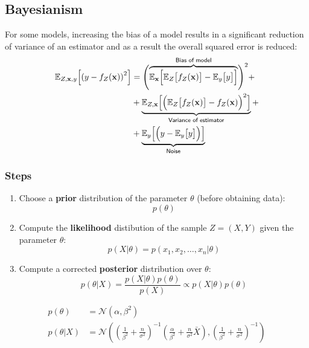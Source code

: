 \subsection{Bayesianism}
For some models, increasing the bias of a model results in a significant reduction of variance of an estimator and as a result the overall squared error is reduced:
\noindent\begin{align*}
    \mathbb{E}_{Z,\mathbf{x},y}\Bigl[{(y-f_Z(\mathbf{x}))}^2\Bigr] & = \Biggl(\overbrace{\mathbb{E}_{\mathbf{x}}\Bigl[\mathbb{E}_{Z}\bigl[f_Z(\mathbf{x})\bigr]-\mathbb{E}_{y}\bigl[y\bigr]\Bigr]}^{\textsf{Bias of model}}\Biggr)^2 + \\%
                                                                   & +\underbrace{\mathbb{E}_{Z,\mathbf{x}}\Bigl[{\Bigl(\mathbb{E}_{Z}\bigl[f_Z(\mathbf{x})\bigr]-f_Z(\mathbf{x})\Bigr)}^2\Bigr]}_{\textsf{Variance of estimator}}+    \\
                                                                   & +\underbrace{\mathbb{E}_{y}\Bigl[{\Bigl(y-\mathbb{E}_{y}\bigl[y\bigr]\Bigr)}\Bigr]}_{\textsf{Noise}}
\end{align*}

\subsubsection{Steps}
\begin{enumerate}
    \item Choose a \textbf{prior} distribution of the parameter $\theta$ (before obtaining data):
          \noindent\begin{equation*}
              p(\theta)
          \end{equation*}
    \item Compute the \textbf{likelihood} distibution of the sample $Z=(X,Y)$ given the parameter $\theta$:
          \noindent\begin{equation*}
              p(X|\theta) = p(x_1,x_2,\ldots,x_n|\theta)
          \end{equation*}
    \item Compute a corrected \textbf{posterior} distribution over $\theta$:
          \noindent\begin{equation*}
              p(\theta|X)=\frac{p(X|\theta)p(\theta)}{p(X)}\propto p(X|\theta)p(\theta)
          \end{equation*}
\end{enumerate}

\begin{examplesection}[Example]
    \noindent\begin{align*}
        p(\theta)   & =  \mathcal{N}(\alpha,\beta^2)                                                                                                                                                                                      \\
        p(\theta|X) & =\mathcal{N}\left({\left(\frac{1}{\beta^{2}}+\frac{n}{\sigma^{2}}\right)}^{-1}{\left(\frac{\alpha}{\beta^{2}}+\frac{n}{\sigma^{2}}\bar{X}\right),\left(\frac{1}{\beta^{2}}+\frac{n}{\sigma^{2}}\right)}^{-1}\right)
    \end{align*}
\end{examplesection}


